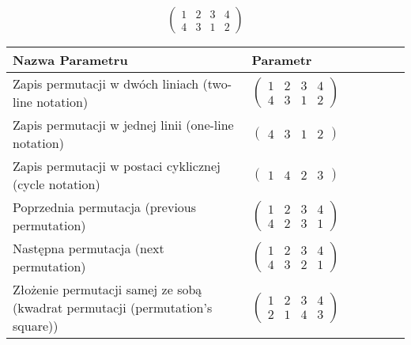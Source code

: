\documentclass[12pt]{article}
\begin{document}
\subsection{}
\begin{center}
\[
\begin{pmatrix}
	1 & 2 & 3 & 4 \\ 
	4 & 3 & 1 & 2 
\end{pmatrix}
\]

\begin{tabular}{|m{0.6\linewidth}|m{0.4\linewidth}|}
	\hline
	Nazwa Parametru & Parametr \\
	\hline
	Zapis permutacji w dwóch liniach (two-line notation) & $\begin{pmatrix} 1 & 2 & 3 & 4 \\ 
4 & 3 & 1 & 2 \end{pmatrix}$ \\ 
	\hline
	Zapis permutacji w jednej linii (one-line notation) & $\begin{pmatrix} 4 & 3 & 1 & 2 \end{pmatrix}$ \\ 
	\hline
	Zapis permutacji w postaci cyklicznej (cycle notation) & $\begin{pmatrix} 1 & 4 & 2 & 3 \end{pmatrix} $ \\ 
	\hline
	Poprzednia permutacja (previous permutation) & $\begin{pmatrix} 1 & 2 & 3 & 4 \\ 
4 & 2 & 3 & 1 \end{pmatrix}$ \\ 
	\hline
	Następna permutacja (next permutation) & $\begin{pmatrix} 1 & 2 & 3 & 4 \\ 
4 & 3 & 2 & 1 \end{pmatrix}$ \\ 
	\hline
	Złożenie permutacji samej ze sobą (kwadrat permutacji (permutation's square)) & $\begin{pmatrix} 1 & 2 & 3 & 4 \\ 
2 & 1 & 4 & 3 \end{pmatrix}$ \\ 
	\hline
\end{tabular}
\end{center}
\end{document}
